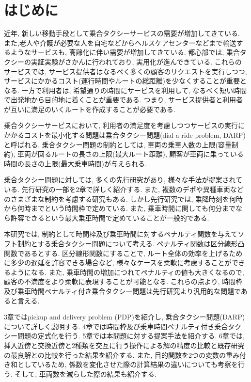 \chapter{はじめに}
近年, 新しい移動手段として乗合タクシーサービスの需要が増加してきている. また,老人や介護が必要な人を自宅などからヘルスケアセンターなどまで輸送するようなサービスも, 高齢化に伴い需要が増加してきている.
都心部では, 乗合タクシーの実証実験がさかんに行われており, 実用化が進んできている. これらのサービスでは, サービス提供者はなるべく多くの顧客のリクエストを実行しつつ, サービスにかかるコスト(運行時間やルートの総距離)を少なくすることが重要となる. 一方で利用者は, 希望通りの時間にサービスを利用して, なるべく短い時間で出発地から目的地に着くことが重要である. つまり, サービス提供者と利用者が互いに満足のいくルートを作成することが必要である.

乗合タクシーサービスにおいて, 利用者の満足度を考慮しつつサービスの実行にかかるコストを最小化する問題は乗合タクシー問題(dial-a-ride problem, DARP)と呼ばれる.
乗合タクシー問題の制約としては, 車両の乗車人数の上限(容量制約), 車両が回るルートの長さの上限(最大ルート距離), 顧客が車両に乗っている時間の長さの上限(最大乗車時間)が与えられる.

乗合タクシー問題に対しては, 多くの先行研究があり, 様々な手法が提案されている. 先行研究の一部を2章で詳しく紹介する. また, 複数のデポや異種車両などのさまざまな制約を考慮する研究もある. しかし先行研究では, 乗降時刻を何時から何時までという時間枠で定めている. また, 乗車時間に関しても何分までなら許容できるという最大乗車時間で定めていることが一般的である.

本研究では, 制約として時間枠及び乗車時間に対するペナルティ関数を与えてソフト制約とする乗合タクシー問題について考える. ペナルティ関数は区分線形凸関数であるとする. 区分線形関数にすることで, ルート全体の効率を上げるために多少の遅延を許容できる場合など, 様々なケースを柔軟に考慮することができるようになる. また, 乗車時間の増加につれてペナルティの値も大きくなるので, 顧客の不満度をより柔軟に表現することが可能となる. これらの点より, 時間枠及び乗車時間ペナルティ付き乗合タクシー問題は先行研究より汎用的な問題であると言える.

3章ではpickup and delivery problem (PDP)を紹介し, 乗合タクシー問題(DARP)について詳しく説明する. 4章では時間枠及び乗車時間ペナルティ付き乗合タクシー問題の定式化を行う. 5章では本問題に対する提案手法を紹介する.
6章では, 挿入近傍と交換近傍と2種類を交互に行う操作による解の精度の比較と既存研究の最良解との比較を行った結果を紹介する. また, 目的関数を2つの変数の重み付き和としているため, 係数を変化させた際の計算結果の違いについても考察を行う. そして, 車両数を減らした際の結果も紹介する.
